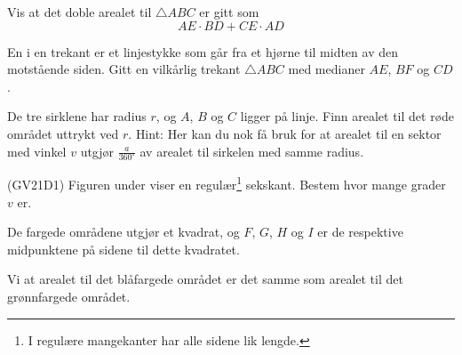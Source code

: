 Vis at det doble arealet til $ \triangle ABC $ er gitt som
\[ AE\cdot BD + CE\cdot AD \]

\newpage
{}
En  i en trekant er et linjestykke som går fra et hjørne til midten av den motstående siden. 
Gitt en vilkårlig trekant $ \triangle ABC $ med medianer $ AE $, $ BF $ og  $ CD $. 

De tre sirklene har radius $ r $, og $ A $, $ B $ og $ C $ ligger på linje.
Finn arealet til det røde området uttrykt ved $ r $.
{\footnotesize Hint: Her kan du nok få bruk for at arealet til en sektor med vinkel $ v $ utgjør $ \frac{a}{360^\circ} $ av arealet til sirkelen med samme radius.}

\newpage
{}
(GV21D1) \os
Figuren under viser en regulær\footnote{I regulære mangekanter har alle sidene lik lengde.} sekskant. Bestem hvor mange grader $  v $ er.

De fargede områdene utgjør et kvadrat, og $ F $, $ G $, $ H $ og $ I $ er de respektive midpunktene på sidene til dette kvadratet.\os

Vi at arealet til det blåfargede området er det samme som arealet til det grønnfargede området.

\newpage
{}


